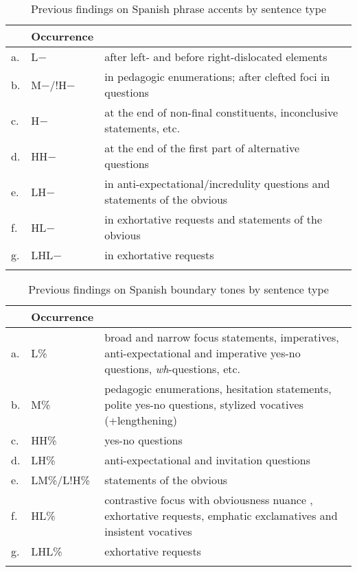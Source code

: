 \begin{table}
	\begin{tabularx}{\textwidth}{l@{~~}lX}
		\lsptoprule
		\multicolumn{2}{l}{Phrase accent}   &  Occurrence \\
		\midrule
		a. & L$-$ & after left- and before right-dislocated elements\\
		b. & M$-$/!H$-$ & in pedagogic enumerations; after clefted foci in questions \\
		c. & H$-$ & at the end of non-final constituents, inconclusive statements, etc. \\
		d. & HH$-$ & at the end of the first part of alternative questions \\
		e. & LH$-$ & in anti-expectational/incredulity questions and statements of the obvious \\
		f. & HL$-$ & in exhortative requests and statements of the obvious \\
		g. & LHL$-$ & in exhortative requests \\
		\lspbottomrule 
	\end{tabularx}
	\caption{Previous findings on Spanish phrase accents by sentence type \citep{Aguilar.2009}\label{tab:phraseacacentsSPANISH}}
\end{table}

\begin{table}
	\begin{tabularx}{\textwidth}{l@{~~}lX}
		\lsptoprule
		\multicolumn{2}{l}{Boundary tone}  &  Occurrence \\
		\midrule
		a. & L\% & broad and narrow focus statements, imperatives, 
		anti-expectational and imperative yes-no questions, \textit{wh}-questions, 
		etc. \\	
		b. & M\% & pedagogic enumerations, hesitation statements, polite 
		yes-no questions, stylized vocatives (+lengthening) \\		
		c. & HH\% & yes-no questions \\
		d. & LH\% & anti-expectational and invitation questions \\
		e. & LM\%/L!H\% & statements of the obvious \\
		f. & HL\% & contrastive focus with obviousness nuance \citep[279]{EstebasVilaplanaPrieto.2008}, exhortative requests, emphatic exclamatives and insistent vocatives \\
		g. & LHL\% & exhortative requests \\
		\lspbottomrule 
	\end{tabularx}
	\caption{Previous findings on Spanish boundary tones by sentence type \citep{Aguilar.2009}\label{tab:boundarytonesSPANISH}}
\end{table}

